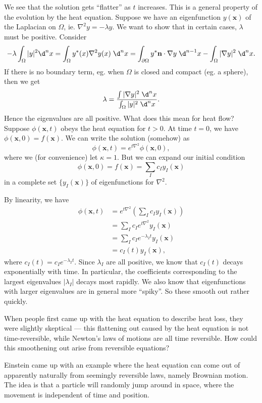 \documentclass[a4paper]{article}
\begin{document}
We see that the solution gets ``flatter'' as $t$ increases. This is a general property of the evolution by the heat equation. Suppose we have an eigenfunction $y(\mathbf{x})$ of the Laplacian on $\Omega$, ie. $\nabla^2 y = -\lambda y$. We want to show that in certain cases, $\lambda$ must be positive. Consider
\[
  - \lambda \int_\Omega |y|^2 \d^n x = \int_\Omega y^*(x) \nabla^2 y(x)\;\d^n x = \int_{\partial\Omega} y^* \mathbf{n}\cdot \nabla y \;\d^{n - 1}x - \int_\Omega |\nabla y|^2 \;\d^n x.
\]
If there is no boundary term, eg. when $\Omega$ is closed and compact (eg. a sphere), then we get
\[
  \lambda = \frac{\int |\nabla y|^2\;\d^n x}{\int_\Omega |y|^2 \;\d^n x}.
\]
Hence the eigenvalues are all positive. What does this mean for heat flow? Suppose $\phi(\mathbf{x}, t)$ obeys the heat equation for $t > 0$. At time $t = 0$, we have $\phi(\mathbf{x}, 0) = f(\mathbf{x})$. We can write the solution (somehow) as
\[
  \phi(\mathbf{x}, t) = e^{t\nabla^2} \phi(\mathbf{x}, 0),
\]
where we (for convenience) let $\kappa = 1$. But we can expand our initial condition
\[
  \phi(\mathbf{x}, 0) = f(\mathbf{x}) = \sum_I c_I y_I(\mathbf{x})
\]
in a complete set $\{y_I(\mathbf{x})\}$ of eigenfunctions for $\nabla^2$.

By linearity, we have
\begin{align*}
  \phi(\mathbf{x}, t) &= e^{t \nabla^2}\left(\sum_I c_I y_I(\mathbf{x})\right) \\
  &= \sum_I c_I e^{t \nabla^2 }y_I(\mathbf{x}) \\
  &= \sum_I c_I e^{-\lambda_2 t}y_I(\mathbf{x}) \\
  &= c_I(t) y_I(\mathbf{x}),
\end{align*}
where $c_I(t) = c_I e^{-\lambda_2 t}$. Since $\lambda_I$ are all positive, we know that $c_I(t)$ decays exponentially with time. In particular, the coefficients corresponding to the largest eigenvalues $|\lambda_I|$ decays most rapidly. We also know that eigenfunctions with larger eigenvalues are in general more ``spiky''. So these smooth out rather quickly.

When people first came up with the heat equation to describe heat loss, they were slightly skeptical --- this flattening out caused by the heat equation is not time-reversible, while Newton's laws of motions are all time reversible. How could this smoothening out arise from reversible equations?

Einstein came up with an example where the heat equation can come out of apparently naturally from seemingly reversible laws, namely Brownian motion. The idea is that a particle will randomly jump around in space, where the movement is independent of time and position.
\end{document}

